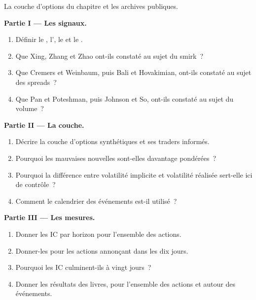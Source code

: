 \begin{problem}\label{pb:s1:options-implied-signals-for-stocks:1}
La couche d'options du chapitre et les archives publiques.

\medskip\noindent\textbf{Partie I --- Les signaux.}
\begin{enumerate}
\item Définir le , l', le  et le .
\item Que Xing, Zhang et Zhao ont-ils constaté au sujet du smirk~?
\item Que Cremers et Weinbaum, puis Bali et Hovakimian, ont-ils constaté au sujet des spreads~?
\item Que Pan et Poteshman, puis Johnson et So, ont-ils constaté au sujet du volume~?
\end{enumerate}

\medskip\noindent\textbf{Partie II --- La couche.}
\begin{enumerate}[resume]
\item Décrire la couche d'options synthétiques et ses traders informés.
\item Pourquoi les mauvaises nouvelles sont-elles davantage pondérées~?
\item Pourquoi la différence entre volatilité implicite et volatilité réalisée sert-elle ici de contrôle~?
\item Comment le calendrier des événements est-il utilisé~?
\end{enumerate}

\medskip\noindent\textbf{Partie III --- Les mesures.}
\begin{enumerate}[resume]
\item Donner les IC par horizon pour l'ensemble des actions.
\item Donner-les pour les actions annonçant dans les dix jours.
\item Pourquoi les IC culminent-ils à vingt jours~?
\item Donner les résultats des livres, pour l'ensemble des actions et autour des événements.
\end{enumerate}


\end{problem}

